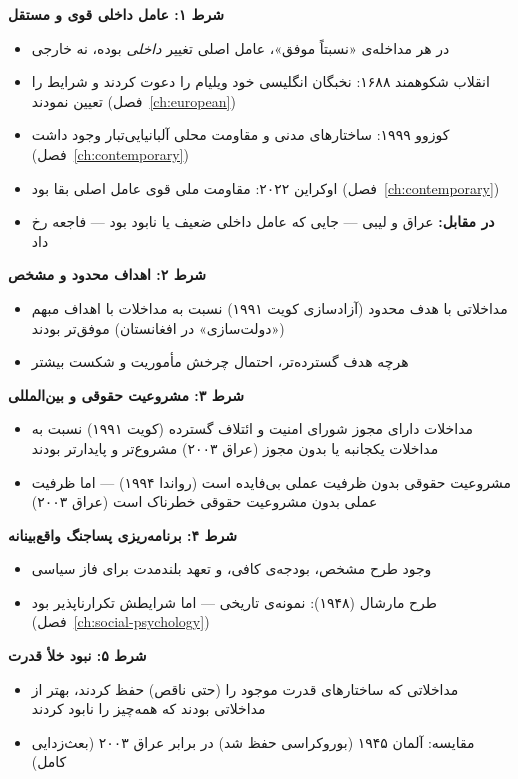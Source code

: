 \begin{tcolorbox}[successbox, title={شرایط لازم برای «مداخله‌ی کمتر بد»}]
\textbf{شرط ۱: عامل داخلی قوی و مستقل}
\begin{itemize}
\item در هر مداخله‌ی «نسبتاً موفق»، عامل اصلی تغییر \textit{داخلی} بوده، نه خارجی
\item انقلاب شکوهمند ۱۶۸۸: نخبگان انگلیسی خود ویلیام را دعوت کردند و شرایط را تعیین نمودند (فصل~\ref{ch:european})
\item کوزوو ۱۹۹۹: ساختارهای مدنی و مقاومت محلی آلبانیایی‌تبار وجود داشت (فصل~\ref{ch:contemporary})
\item اوکراین ۲۰۲۲: مقاومت ملی قوی عامل اصلی بقا بود (فصل~\ref{ch:contemporary})
\item \textbf{در مقابل:} عراق و لیبی — جایی که عامل داخلی ضعیف یا نابود بود — فاجعه رخ داد
\end{itemize}

\textbf{شرط ۲: اهداف محدود و مشخص}
\begin{itemize}
\item مداخلاتی با هدف محدود (آزادسازی کویت ۱۹۹۱) نسبت به مداخلات با اهداف مبهم («دولت‌سازی» در افغانستان) موفق‌تر بودند
\item هرچه هدف گسترده‌تر، احتمال چرخش مأموریت و شکست بیشتر
\end{itemize}

\textbf{شرط ۳: مشروعیت حقوقی و بین‌المللی}
\begin{itemize}
\item مداخلات دارای مجوز شورای امنیت و ائتلاف گسترده (کویت ۱۹۹۱) نسبت به مداخلات یکجانبه یا بدون مجوز (عراق ۲۰۰۳) مشروع‌تر و پایدارتر بودند
\item مشروعیت حقوقی بدون ظرفیت عملی بی‌فایده است (رواندا ۱۹۹۴) — اما ظرفیت عملی بدون مشروعیت حقوقی خطرناک است (عراق ۲۰۰۳)
\end{itemize}

\textbf{شرط ۴: برنامه‌ریزی پساجنگ واقع‌بینانه}
\begin{itemize}
\item وجود طرح مشخص، بودجه‌ی کافی، و تعهد بلندمدت برای فاز سیاسی
\item طرح مارشال (۱۹۴۸): نمونه‌ی تاریخی — اما شرایطش تکرارناپذیر بود (فصل~\ref{ch:social-psychology})
\end{itemize}

\textbf{شرط ۵: نبود خلأ قدرت}
\begin{itemize}
\item مداخلاتی که ساختارهای قدرت موجود را (حتی ناقص) حفظ کردند، بهتر از مداخلاتی بودند که همه‌چیز را نابود کردند
\item مقایسه: آلمان ۱۹۴۵ (بوروکراسی حفظ شد) در برابر عراق ۲۰۰۳ (بعث‌زدایی کامل)
\end{itemize}


\end{tcolorbox}
